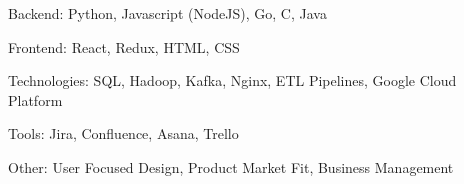 

\begin{cventries}

    \begin{cvitems} %
        \item {Backend: 
        Python,
        Javascript (NodeJS),
        Go,
        C,
        Java}
        \item{
        Frontend:
        React,
        Redux,
        HTML,
        CSS}
        \item{
        Technologies: 
        SQL,
	    Hadoop,
        Kafka,
        Nginx,
	    ETL Pipelines,
	    Google Cloud Platform
        }
        \item{
        Tools:
        Jira,
        Confluence,
        Asana,
        Trello
        }
        \item{
        Other:
        User Focused Design,
        Product Market Fit,
        Business Management
        }
      \end{cvitems}
\end{cventries}
